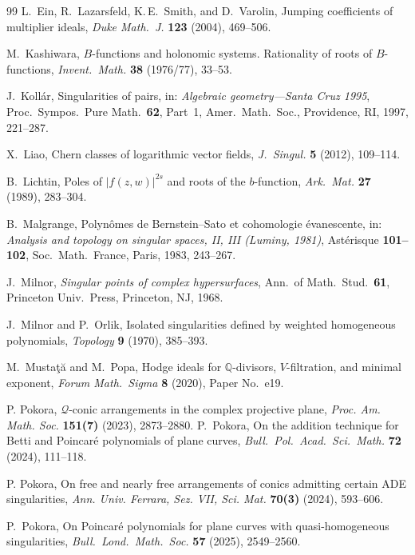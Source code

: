 \documentclass[11pt]{amsart}
\theoremstyle{definition}
\numberwithin{equation}{section}
\begin{document}
\begin{thebibliography}{99}
L.~Ein, R.~Lazarsfeld, K.\,E.~Smith, and D.~Varolin, Jumping coefficients of multiplier ideals, \emph{Duke Math.\ J.} \textbf{123} (2004), 469--506.

M.~Kashiwara, $B$-functions and holonomic systems. Rationality of roots of $B$-functions, \emph{Invent.\ Math.} \textbf{38} (1976/77), 33--53.

J.~Koll\'ar, Singularities of pairs, in: \emph{Algebraic geometry---Santa Cruz 1995}, Proc.\ Sympos.\ Pure Math.\ \textbf{62}, Part~1, Amer.\ Math.\ Soc., Providence, RI, 1997, 221--287.

X.~Liao, Chern classes of logarithmic vector fields, \emph{J.~Singul.} \textbf{5} (2012), 109--114.

B.~Lichtin, Poles of $|f(z,w)|^{2s}$ and roots of the $b$-function, \emph{Ark.\ Mat.} \textbf{27} (1989), 283--304.

B.~Malgrange, Polyn\^omes de Bernstein--Sato et cohomologie \'evanescente, in: \emph{Analysis and topology on singular spaces, II, III (Luminy, 1981)}, Ast\'erisque \textbf{101--102}, Soc.\ Math.\ France, Paris, 1983, 243--267.

J.~Milnor, \emph{Singular points of complex hypersurfaces}, Ann.\ of Math.\ Stud.\ \textbf{61}, Princeton Univ.\ Press, Princeton, NJ, 1968.

J.~Milnor and P.~Orlik, Isolated singularities defined by weighted homogeneous polynomials, \emph{Topology} \textbf{9} (1970), 385--393.

M.~Musta\c{t}\u{a} and M.~Popa, Hodge ideals for $\mathbb{Q}$-divisors, $V$-filtration, and minimal exponent, \emph{Forum Math.\ Sigma} \textbf{8} (2020), Paper No.~e19.

P. Pokora, $\mathcal{Q}$-conic arrangements in the complex projective plane, \textit{Proc. Am. Math. Soc.} \textbf{151(7)} (2023), 2873--2880.
P.~Pokora, On the addition technique for Betti and Poincar\'e polynomials of plane curves, \emph{Bull.\ Pol.\ Acad.\ Sci.\ Math.} \textbf{72} (2024), 111--118.

P. Pokora, On free and nearly free arrangements of conics admitting certain ADE singularities, \textit{Ann. Univ. Ferrara, Sez. VII, Sci. Mat.} \textbf{70(3)} (2024), 593--606.

P.~Pokora, On Poincar\'e polynomials for plane curves with quasi-homogeneous singularities, \emph{Bull.\ Lond.\ Math.\ Soc.} \textbf{57} (2025), 2549--2560.


\end{thebibliography}
\end{document}
